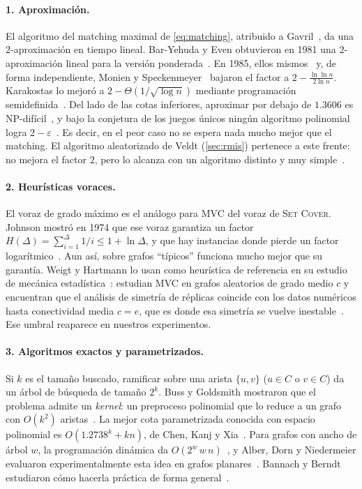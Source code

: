 \paragraph{1. Aproximación.} El algoritmo del matching maximal de \eqref{eq:matching}, atribuido a Gavril~\citep{garey1979}, da una $2$-aproximación en tiempo lineal. Bar-Yehuda y Even obtuvieron en 1981 una $2$-aproximación lineal para la versión ponderada~\citep{baryehuda1981}. En 1985, ellos mismos~\citep{baryehuda1985} y, de forma independiente, Monien y Speckenmeyer~\citep{monien1985} bajaron el factor a $2-\frac{\ln\ln n}{2\ln n}$. Karakostas lo mejoró a $2-\Theta(1/\sqrt{\log n})$ mediante programación semidefinida~\citep{karakostas2009}. Del lado de las cotas inferiores, aproximar por debajo de $1.3606$ es NP-difícil~\citep{dinur2005}, y bajo la conjetura de los juegos únicos ningún algoritmo polinomial logra $2-\varepsilon$~\citep{khot2008}. Es decir, en el peor caso no se espera nada mucho mejor que el matching. El algoritmo aleatorizado de Veldt (\cref{sec:rmis}) pertenece a este frente: no mejora el factor $2$, pero lo alcanza con un algoritmo distinto y muy simple~\citep{veldt2024}.

\paragraph{2. Heurísticas voraces.} El voraz de grado máximo es el análogo para MVC del voraz de \textsc{Set Cover}. Johnson mostró en 1974 que ese voraz garantiza un factor $H(\Delta)=\sum_{i=1}^{\Delta}1/i\le 1+\ln\Delta$, y que hay instancias donde pierde un factor logarítmico~\citep{johnson1974}. Aun así, sobre grafos ``típicos'' funciona mucho mejor que su garantía. Weigt y Hartmann lo usan como heurística de referencia en su estudio de mecánica estadística~\citep{weigt2000,weigt2001}: estudian MVC en grafos aleatorios de grado medio $c$ y encuentran que el análisis de simetría de réplicas coincide con los datos numéricos hasta conectividad media $c=e$, que es donde esa simetría se vuelve inestable~\citep{weigt2000}. Ese umbral reaparece en nuestros experimentos.

\paragraph{3. Algoritmos exactos y parametrizados.} Si $k$ es el tamaño buscado, ramificar sobre una arista $\{u,v\}$ ($u\in C$ o $v\in C$) da un árbol de búsqueda de tamaño $2^k$. Buss y Goldsmith mostraron que el problema admite un \emph{kernel}: un preproceso polinomial que lo reduce a un grafo con $O(k^2)$ aristas~\citep{buss1993}. La mejor cota parametrizada conocida con espacio polinomial es $O(1.2738^k+kn)$, de Chen, Kanj y Xia~\citep{chen2010}. Para grafos con ancho de árbol $w$, la programación dinámica da $O(2^w\,w\,n)$~\citep{cygan2015}, y Alber, Dorn y Niedermeier evaluaron experimentalmente esta idea en grafos planares~\citep{alber2005}. Bannach y Berndt estudiaron cómo hacerla práctica de forma general~\citep{bannach2019}.

